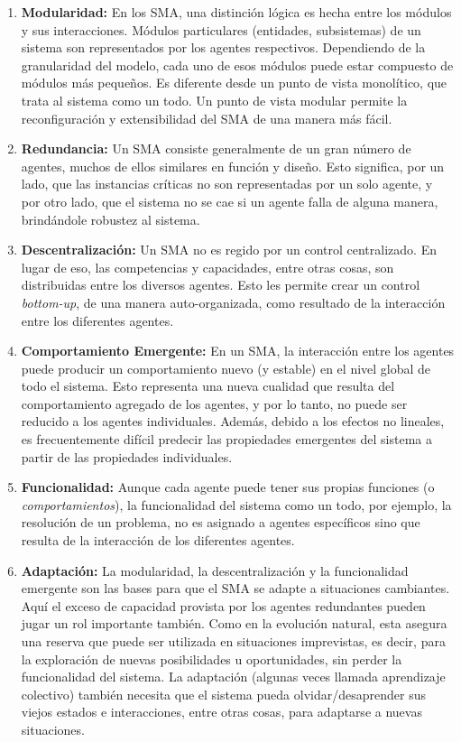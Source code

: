 \begin{enumerate}
\item \textbf{Modularidad:} En los SMA, una distinción lógica es hecha entre los módulos y
sus interacciones. Módulos particulares (entidades, subsistemas) de un sistema
son representados por los agentes respectivos. Dependiendo de la granularidad
del modelo, cada uno de esos módulos puede estar compuesto de módulos más
pequeños. Es diferente desde un punto de vista monolítico, que trata al sistema
como un todo. Un punto de vista modular permite la reconfiguración y
extensibilidad del SMA de una manera más fácil.
\item \textbf{Redundancia:} Un SMA consiste
generalmente de un gran número de agentes, muchos de ellos similares en función
y diseño. Esto significa, por un lado, que las instancias críticas no son
representadas por un solo agente, y por otro lado, que el sistema no se cae si
un agente falla de alguna manera, brindándole robustez al sistema.
\item \textbf{Descentralización:} Un SMA no es regido por un control centralizado. En lugar de
eso, las competencias y capacidades, entre otras cosas, son distribuidas entre
los diversos agentes. Esto les permite crear un control \textit{bottom-up}, de una
manera auto-organizada, como resultado de la interacción entre los diferentes
agentes.
\item \textbf{Comportamiento Emergente:} En un SMA, la interacción entre los
agentes puede producir un comportamiento nuevo (y estable) en el nivel global de
todo el sistema. Esto representa una nueva cualidad que resulta del
comportamiento agregado de los agentes, y por lo tanto, no puede ser reducido a
los agentes individuales. Además, debido a los efectos no lineales, es
frecuentemente difícil predecir las propiedades emergentes del sistema a partir
de las propiedades individuales.
\item \textbf{Funcionalidad:} Aunque cada agente puede
tener sus propias funciones (o \textit{comportamientos}), la funcionalidad del sistema
como un todo, por ejemplo, la resolución de un problema, no es asignado a
agentes específicos sino que resulta de la interacción de los diferentes
agentes.
\item \textbf{Adaptación:} La modularidad, la descentralización y la funcionalidad
emergente son las bases para que el SMA se adapte a situaciones cambiantes. Aquí
el exceso de capacidad provista por los agentes redundantes pueden jugar un rol
importante también. Como en la evolución natural, esta asegura una reserva que
puede ser utilizada en situaciones imprevistas, es decir, para la exploración de
nuevas posibilidades u oportunidades, sin perder la funcionalidad del sistema.
La adaptación (algunas veces llamada aprendizaje colectivo) también necesita que
el sistema pueda olvidar/desaprender sus viejos estados e interacciones, entre
otras cosas, para adaptarse a nuevas situaciones.
\end{enumerate}

